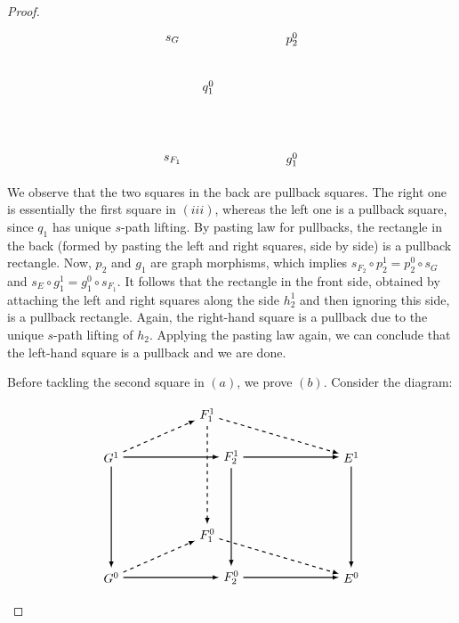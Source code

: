 \documentclass[a4paper,reqno,12pt]{amsart}
\theoremstyle{definition}
\theoremstyle{remark}
\begin{document}
\begin{proof}
\[\begin{tikzpicture}[scale=1.7]
\node at (0.8,0.5) {$s_G$};
\node at (0.8,-1.5) {$s_{F_1}$};
\node at (2.8,0.5) {$p_2^0$};
\node at (2.8,-1.5) {$g_1^0$};

\node at (1.4,-0.3) {$q_1^0$};

\end{tikzpicture}
\]
We observe that the two squares in the back are pullback squares. The right one is essentially the first square in $(iii)$, whereas the left one is a pullback square, since $q_1$ has unique $s$-path lifting. By pasting law for pullbacks, the rectangle in the back (formed by pasting the left and right squares, side by side) is a pullback rectangle. Now, $p_2$ and $g_1$ are graph morphisms, which implies $s_{F_2}\circ p_2^1=p_2^0\circ s_G$ and $s_E\circ g_1^1=g_1^0\circ s_{F_1}$. It follows that the rectangle in the front side, obtained by attaching the left and right squares along the side $h_2^1$ and then ignoring this side, is a pullback rectangle. Again, the right-hand square is a pullback due to the unique $s$-path lifting of $h_2$. Applying the pasting law again, we can conclude that the left-hand square is a pullback and we are done. 

Before tackling the second square in $(a)$, we prove $(b)$. Consider the diagram:

\[
\begin{tikzpicture}[scale=1.7]
\node[] (A1) at (0,0) {$G^1$};
\node[] (A2) at (2,0) {$F_2^1$};
\node[] (A3) at (0,-2) {$G^0$};
\node[] (A4) at (2,-2) {$F_2^0$};

\node[] (B1) at (1.6,0.7) {$F_1^1$};
\node[] (B2) at (4,0) {$E^1$};
\node[] (B3) at (1.6,-1.3) {$F_1^0$};
\node[] (B4) at (4,-2) {$E^0$};

\path[->, black, >=latex,thick] (A1) edge [] node[]{} (A2);
\path[->, black, >=latex,thick] (A3) edge [] node[]{} (A4);
\path[->, black, >=latex,thick] (A1) edge [] node[]{} (A3);
\path[->, black, >=latex,thick] (A2) edge [] node[]{} (A4);

\path[->,black, dashed, >=latex,thick] (B1) edge [] node[]{} (B3);
\path[->,black, >=latex,thick] (A4) edge [] node[]{} (B4);
\path[->,black, >=latex,thick] (A2) edge [] node[]{} (B2);
\path[->,black, >=latex,thick] (B2) edge [] node[]{} (B4);

\path[->,black, dashed, >=latex,thick] (A1) edge [] node {} (B1);
\path[->,black, dashed, >=latex,thick] (A3) edge [] node {} (B3);
\path[->,black, dashed, >=latex,thick] (B1) edge [] node {} (B2);
\path[->,black, dashed, >=latex,thick] (B3) edge [] node {} (B4);


\end{tikzpicture}\]
\end{proof}
\end{document}

